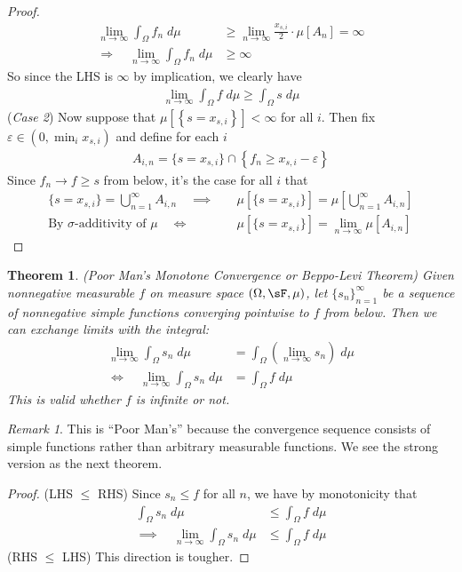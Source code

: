 \documentclass[12pt]{article}
\theoremstyle{plain}
\newtheorem{thm}{Theorem}[section]
\theoremstyle{definition}
\theoremstyle{remark}
\newtheorem*{rmk}{Remark}
\newcommand{\ra}{\rightarrow}
\newcommand{\ninf}{_{n=1}^\infty}
\newcommand{\limn}{\lim_{n\rightarrow\infty}}
\begin{document}
\begin{proof}
\begin{align*}
  \limn \int_\Omega f_n \; d\mu
  &\geq
  \limn
  \frac{x_{s,i}}{2} \cdot \mu[A_n] = \infty \\
  \Rightarrow\quad
  \limn \int_\Omega f_n \; d\mu
  &\geq
  \infty
\end{align*}
So since the LHS is $\infty$ by implication, we clearly have
\begin{align*}
  \limn \int_\Omega f\;d\mu \geq \int_\Omega s\;d\mu
\end{align*}
(\emph{Case 2}) Now suppose that
$\mu[\left\{ s=x_{s,i} \right\}] <\infty$ for all $i$.
Then fix $\varepsilon \in (0,\min_i x_{s,i})$ and define for each $i$
\begin{align*}
  A_{i,n}
  =
  \{s = x_{s,i}\}
  \cap
  \left\{ f_n \geq x_{s,i} -\varepsilon\right\}
\end{align*}
Since $f_n\ra f \geq s$ from below, it's the case for all $i$ that
\begin{align*}
  \{s=x_{s,i}\} = \bigcup\ninf A_{i,n}
  \quad\implies&\quad
  \mu[\{s=x_{s,i}\}] = \mu\left[\bigcup\ninf A_{i,n}\right] \\
  \text{By $\sigma$-additivity of $\mu$}
  \quad \iff&\quad
  \mu[\{s=x_{s,i}\}] = \limn \mu\left[A_{i,n}\right]
\end{align*}
\end{proof}


\begin{thm}\emph{(Poor Man's Monotone Convergence or Beppo-Levi Theorem)}
Given nonnegative measurable $f$ on measure space $(\Omega,\sF,\mu)$,
let $\{s_n\}\ninf$ be a sequence of nonnegative simple functions
converging pointwise to $f$ from below.
Then we can exchange limits with the integral:
\begin{align*}
    \lim_{n\rightarrow\infty} \int_\Omega s_n \; d\mu &=
    \int_\Omega \left(\lim_{n\rightarrow\infty} s_n\right) \; d\mu \\
    \iff\quad
    \lim_{n\rightarrow\infty} \int_\Omega s_n \; d\mu &=
    \int_\Omega f \; d\mu
\end{align*}
This is valid whether $f$ is infinite or not.
\end{thm}
\begin{rmk}
This is ``Poor Man's'' because the convergence sequence consists of
simple functions rather than arbitrary measurable functions.
We see the strong version as the next theorem.
\end{rmk}
\begin{proof}
(LHS $\leq$ RHS) Since $s_n\leq f$ for all $n$, we have by monotonicity
that
\begin{align*}
  \int_\Omega s_n \;d\mu
  &\leq
  \int_\Omega f \;d\mu \\
  \implies\quad
  \limn \int_\Omega s_n \;d\mu
  &\leq
  \int_\Omega f \;d\mu
\end{align*}
(RHS $\leq$ LHS) This direction is tougher.
\end{proof}
\end{document}
